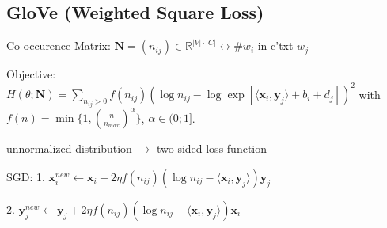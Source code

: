 \documentclass[a4paper, 11pt, landscape]{article}
\DeclareMathOperator*{\argmin}{arg\,min}
\begin{document}
\begin{multicols*}{3}
\subsection{GloVe (Weighted Square Loss)}
\begin{compactdesc}
  \item[Co-occurence Matrix:]$\mathbf{N} = (n_{ij}) \in \mathbb{R}^{|V|\cdot |C|} \leftrightarrow \# w_i$ in c'txt $w_j$
  \item[Objective:] $H(\theta;\mathbf{N}) = \sum_{n_{ij} > 0} f(n_{ij})(\log n_{ij} - \log \exp[\langle \mathbf{x}_i, \mathbf{y}_j \rangle + b_i + d_j])^2$ with $f(n) = \min\{1, (\frac{n}{n_{max}})^\alpha\}$, $\alpha \in (0;1]$.
\end{compactdesc}
unnormalized distribution $\rightarrow$ two-sided loss function
\begin{compactdesc}
  \item[SGD:] 1. $\mathbf{x}_i^{new} \leftarrow \mathbf{x}_i + 2\eta f(n_{ij})(\log n_{ij} - \langle \mathbf{x}_i, \mathbf{y}_j \rangle)\mathbf{y}_j$ 
  \item \hspace{26pt}2. $\mathbf{y}_j^{new} \leftarrow \mathbf{y}_j + 2\eta f(n_{ij})(\log n_{ij} - \langle \mathbf{x}_i, \mathbf{y}_j \rangle)\mathbf{x}_i$
\end{compactdesc}




\end{multicols*}
\end{document}
